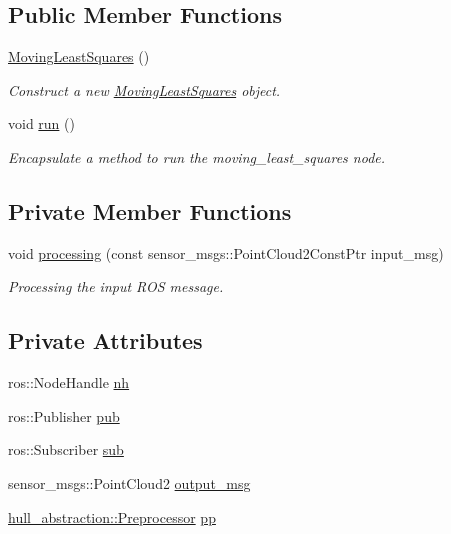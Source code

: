 \subsection*{Public Member Functions}
\begin{DoxyCompactItemize}
\item 
\hyperlink{classmoving__least__squares__node_1_1_moving_least_squares_a55eba7b489543e53e018651e1039e51a}{Moving\+Least\+Squares} ()
\begin{DoxyCompactList}\small\item\em Construct a new \hyperlink{classmoving__least__squares__node_1_1_moving_least_squares}{Moving\+Least\+Squares} object. \end{DoxyCompactList}\item 
void \hyperlink{classmoving__least__squares__node_1_1_moving_least_squares_afb03a339aa9ae129d42af0b7d49dfb2c}{run} ()
\begin{DoxyCompactList}\small\item\em Encapsulate a method to run the moving\+\_\+least\+\_\+squares node. \end{DoxyCompactList}\end{DoxyCompactItemize}
\subsection*{Private Member Functions}
\begin{DoxyCompactItemize}
\item 
void \hyperlink{classmoving__least__squares__node_1_1_moving_least_squares_ab334356e26407324a4fb15ab3dbf9daa}{processing} (const sensor\+\_\+msgs\+::\+Point\+Cloud2\+Const\+Ptr input\+\_\+msg)
\begin{DoxyCompactList}\small\item\em Processing the input R\+OS message. \end{DoxyCompactList}\end{DoxyCompactItemize}
\subsection*{Private Attributes}
\begin{DoxyCompactItemize}
\item 
ros\+::\+Node\+Handle \hyperlink{classmoving__least__squares__node_1_1_moving_least_squares_ae4c2a5c0960cec2bc990d0f19fee3ecb}{nh}
\item 
ros\+::\+Publisher \hyperlink{classmoving__least__squares__node_1_1_moving_least_squares_a575c8db3fd78dc6e4bfd432d2d75916c}{pub}
\item 
ros\+::\+Subscriber \hyperlink{classmoving__least__squares__node_1_1_moving_least_squares_a3afb046b92a8d8df03d06542ba9fc9bd}{sub}
\item 
sensor\+\_\+msgs\+::\+Point\+Cloud2 \hyperlink{classmoving__least__squares__node_1_1_moving_least_squares_af6fbf84b91043961cc80fb71505992dd}{output\+\_\+msg}
\item 
\hyperlink{classhull__abstraction_1_1_preprocessor}{hull\+\_\+abstraction\+::\+Preprocessor} \hyperlink{classmoving__least__squares__node_1_1_moving_least_squares_a64551d7faad6e219620e142472edbada}{pp}
\end{DoxyCompactItemize}


